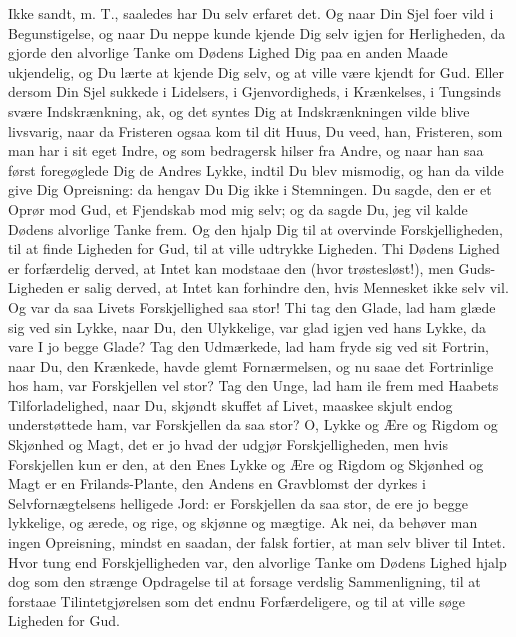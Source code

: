 \documentclass[12pt,a4paper]{article}
\begin{document}
Ikke sandt, m. T., saaledes har Du selv erfaret det. Og naar Din Sjel foer vild i Begunstigelse, og naar Du neppe kunde kjende Dig selv igjen for Herligheden, da gjorde den alvorlige Tanke om Dødens Lighed Dig paa en anden Maade ukjendelig, og Du lærte at kjende Dig selv, og at ville være kjendt for Gud. Eller dersom Din Sjel sukkede i Lidelsers, i Gjenvordigheds, i Krænkelses, i Tungsinds svære Indskrænkning, ak, og det syntes Dig at Indskrænkningen vilde blive livsvarig, naar da Fristeren ogsaa kom til dit Huus, Du veed, han, Fristeren, som man har i sit eget Indre, og som bedragersk hilser fra Andre, og naar han saa først foregøglede Dig de Andres Lykke, indtil Du blev mismodig, og han da vilde give Dig Opreisning: da hengav Du Dig ikke i Stemningen. Du sagde, den er et Oprør mod Gud, et Fjendskab mod mig selv; og da sagde Du, jeg vil kalde Dødens alvorlige Tanke frem. Og den hjalp Dig til at overvinde Forskjelligheden, til at finde Ligheden for Gud, til at ville udtrykke Ligheden. Thi Dødens Lighed er forfærdelig derved, at Intet kan modstaae den (hvor trøstesløst!), men Guds-Ligheden er salig derved, at Intet kan forhindre den, hvis Mennesket ikke selv vil. Og var da saa Livets Forskjellighed saa stor! Thi tag den Glade, lad ham glæde sig ved sin Lykke, naar Du, den Ulykkelige, var glad igjen ved hans Lykke, da vare I jo begge Glade? Tag den Udmærkede, lad ham fryde sig ved sit Fortrin, naar Du, den Krænkede, havde glemt Fornærmelsen, og nu saae det Fortrinlige hos ham, var Forskjellen vel stor? Tag den Unge, lad ham ile frem med Haabets Tilforladelighed, naar Du, skjøndt skuffet af Livet, maaskee skjult endog understøttede ham, var Forskjellen da saa stor? O, Lykke og Ære og Rigdom og Skjønhed og Magt, det er jo hvad der udgjør Forskjelligheden, men hvis Forskjellen kun er den, at den Enes Lykke og Ære og Rigdom og Skjønhed og Magt er en Frilands-Plante, den Andens en Gravblomst der dyrkes i Selvfornægtelsens helligede Jord: er Forskjellen da saa stor, de ere jo begge lykkelige, og ærede, og rige, og skjønne og mægtige. Ak nei, da behøver man ingen Opreisning, mindst en saadan, der falsk fortier, at man selv bliver til Intet. Hvor tung end Forskjelligheden var, den alvorlige Tanke om Dødens Lighed hjalp dog som den strænge Opdragelse til at forsage verdslig Sammenligning, til at forstaae Tilintetgjørelsen som det endnu Forfærdeligere, og til at ville søge Ligheden for Gud.
\end{document}
